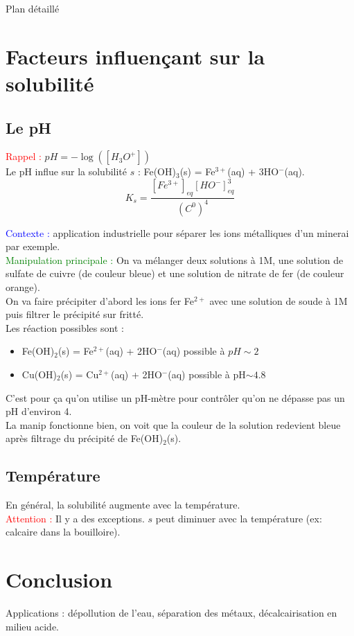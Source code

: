 \begin{reportBlock}{Plan détaillé}
\section{Facteurs influençant sur la solubilité}
\subsection{Le pH}
\textcolor{red}{Rappel :} $pH = -\log([H_3O^+])$ \\
Le pH influe sur la solubilité $s$ : Fe(OH)$_3$(s) = Fe$^{3+}$(aq) + 3HO$^-$(aq).
\begin{equation}
    K_s = \frac{[Fe^{3+}]_{eq}[HO^-]_{eq}^3}{(C^{0})^4}
\end{equation}

\textcolor{blue}{Contexte :} application industrielle pour séparer les ions métalliques d'un minerai par exemple.\\
\textcolor{green}{Manipulation principale :} On va mélanger deux solutions à 1M, une solution de sulfate de cuivre (de couleur bleue) et une solution de nitrate de fer (de couleur orange).\\ %
On va faire précipiter d'abord les ions fer Fe$^{2+}$ avec une solution de soude à 1M puis filtrer le précipité sur fritté.\\
Les réaction possibles sont :
\begin{itemize}
    \item Fe(OH)$_2$(s) = Fe$^{2+}$(aq) + 2HO$^-$(aq) possible à $pH\sim2$
    \item Cu(OH)$_2$(s) = Cu$^{2+}$(aq) + 2HO$^-$(aq) possible à pH$\sim 4.8$
\end{itemize}
C'est pour ça qu'on utilise un pH-mètre pour contrôler qu'on ne dépasse pas un pH d'environ 4.\\
La manip fonctionne bien, on voit que la couleur de la solution redevient bleue après filtrage du précipité de Fe(OH)$_2$(s).
\subsection{Température}
En général, la solubilité augmente avec la température.\\
\textcolor{red}{Attention : } Il y a des exceptions. $s$ peut diminuer avec la température (ex: calcaire dans la bouilloire).


\section{Conclusion} 
Applications : dépollution de l'eau, séparation des métaux, décalcairisation en milieu acide.

\end{reportBlock}

